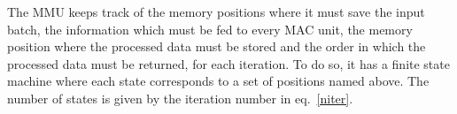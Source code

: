 \documentclass[conference,compsoc]{IEEEtran}
\begin{document}
The MMU keeps track of the memory positions where it must save the input batch,
the information which must be fed to every MAC unit, the memory position where
the processed data must be stored and the order in which the processed data must
be returned, for each iteration. To do so, it has a finite state machine where
each state corresponds to a set of positions named above. The number of states
is given by the iteration number in eq.~\ref{niter}.

\begin{figure}[!t]
\centering
{}
\hfil %
\centering
{}
\end{figure}
\end{document}
